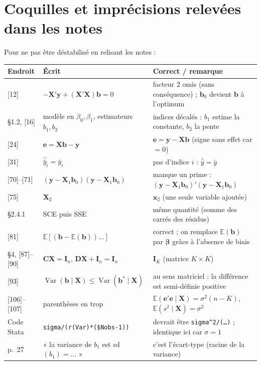 \documentclass[11pt,a4paper]{article}
\newcommand{\vy}{\mathbf{y}}
\newcommand{\vX}{\mathbf{X}}
\newcommand{\ve}{\mathbf{e}}
\newcommand{\vb}{\mathbf{b}}
\newcommand{\vx}{\mathbf{x}}
\newcommand{\vbeta}{\bm{\beta}}
\newcommand{\I}{\mathbf{I}}
\newcommand{\C}{\mathbf{C}}
\newcommand{\D}{\mathbf{D}}
\newcommand{\XtX}{\vX'\vX}
\newcommand{\E}{\mathbb{E}}
\newcommand{\Var}{\operatorname{Var}}
\begin{document}
\section{Coquilles et imprécisions relevées dans les notes}
Pour ne pas être déstabilisé en relisant les notes :
\begin{center}
\renewcommand{\arraystretch}{1.25}
\begin{tabular}{@{}p{2.3cm}p{6cm}p{6.5cm}@{}}
\toprule
Endroit & Écrit & Correct / remarque \\
\midrule
{[12]} & $-\vX'\vy+(\XtX)\vb=0$ & facteur 2 omis (sans conséquence) ; $\vb_0$ devient $\vb$ à l'optimum \\
§1.2, [16] & modèle en $\beta_0,\beta_1$, estimateurs $b_1,b_2$ & indices décalés : $b_1$ estime la constante, $b_2$ la pente \\
{[24]} & $\ve=\vX\vb-\vy$ & $\ve=\vy-\vX\vb$ (signe sans effet car $=0$) \\
{[31]} & $\hat{\bar y}_i=\bar y_i$ & pas d'indice $i$ : $\bar{\hat y}=\bar y$ \\
{[70]--[71]} & $(\vy-\vX_1\vb_0)(\vy-\vX_1\vb_0)$ & manque un prime : $(\vy-\vX_1\vb_0)'(\vy-\vX_1\vb_0)$ \\
{[75]} & $\vX_2$ & $\vx_2$ (une seule variable ajoutée) \\
§2.4.1 & SCE puis SSE & même quantité (somme des carrés des résidus) \\
{[81]} & $\E[(\vb-\E(\vb))\dots]$ & correct ; on remplace $\E(\vb)$ par $\vbeta$ grâce à l'absence de biais \\
§4, [87]--[90] & $\C\vX=\I_n$, $\D\vX+\I_n=\I_n$ & $\I_K$ (matrice $K\times K$) \\
{[93]} & $\Var(\vb\mid\vX)\le\Var(\vb^*\mid\vX)$ & au sens matriciel : la différence est semi-définie positive \\
{[106]--[107]} & parenthèses en trop & $\E(\ve'\ve\mid\vX)=\sigma^2(n-K)$, $\E(s^2\mid\vX)=\sigma^2$ \\
Code Stata & \texttt{sigma/(r(Var)*(\$Nobs-1))} & devrait être \texttt{sigma\^{}2/(\dots)} ; identique ici car $\sigma=1$ \\
p.~27 & « la variance de $b_1$ est sd$(b_1)=\dots$ » & c'est l'écart-type (racine de la variance) \\
\bottomrule
\end{tabular}
\end{center}

\end{document}

